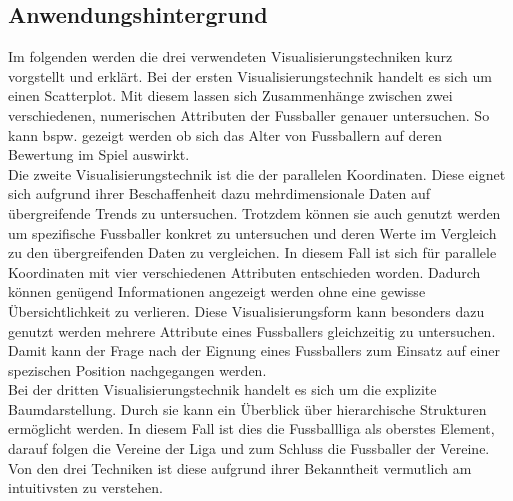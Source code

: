 \documentclass[usegeometry=true]{scrartcl}
\begin{document}
\newpage


\subsection{Anwendungshintergrund}

Im folgenden werden die drei verwendeten Visualisierungstechniken kurz vorgstellt und erklärt.
Bei der ersten Visualisierungstechnik handelt es sich um einen Scatterplot.\cite{noauthor_complete_nodate} Mit diesem lassen sich Zusammenhänge zwischen zwei verschiedenen, numerischen Attributen der Fussballer genauer untersuchen. So kann bspw. gezeigt werden ob sich das Alter von Fussballern auf deren Bewertung im Spiel auswirkt.\\
Die zweite Visualisierungstechnik ist die der parallelen Koordinaten.\cite{few_multivariate_nodate} Diese eignet sich aufgrund ihrer Beschaffenheit dazu mehrdimensionale Daten auf übergreifende Trends zu untersuchen. Trotzdem können sie auch genutzt werden um spezifische Fussballer konkret zu untersuchen und deren Werte im Vergleich zu den übergreifenden Daten zu vergleichen. In diesem Fall ist sich für parallele Koordinaten mit vier verschiedenen Attributen entschieden worden. Dadurch können genügend Informationen angezeigt werden ohne eine gewisse Übersichtlichkeit zu verlieren. Diese Visualisierungsform kann besonders dazu genutzt werden mehrere Attribute eines Fussballers gleichzeitig zu untersuchen. Damit kann der Frage nach der Eignung eines Fussballers zum Einsatz auf einer spezischen Position nachgegangen werden.\\
Bei der dritten Visualisierungstechnik handelt es sich um die explizite Baumdarstellung. Durch sie kann ein Überblick über hierarchische Strukturen ermöglicht werden. In diesem Fall ist dies die Fussballliga als oberstes Element, darauf folgen die Vereine der Liga und zum Schluss die Fussballer der Vereine. Von den drei Techniken ist diese aufgrund ihrer Bekanntheit vermutlich am intuitivsten zu verstehen.


\end{document}
